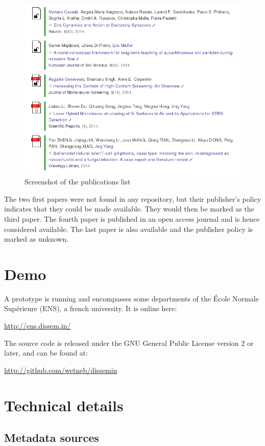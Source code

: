\documentclass[a4paper]{article}
\begin{document}
\begin{figure}[htbp]
\centering
\includegraphics[scale=0.5]{img/publist.png}
\caption{Screenshot of the publications list}
\end{figure}

The two first papers were not found in any repository, but their
publisher's policy indicates that they could be made available. They
would then be marked as the third paper. The fourth paper is published
in an open access journal and is hence considered available. The last
paper is also available and the publisher policy is marked as unknown.

\section{Demo}

A prototype is running and encompasses some departments of the École
Normale Supérieure (ENS), a french university. It is online here:

\url{http://ens.dissem.in/}

The source code is released under the GNU General Public License version
2 or later, and can be found at:

\url{http://github.com/wetneb/dissemin}

\section{Technical details}

\subsection{Metadata sources}
\end{document}
